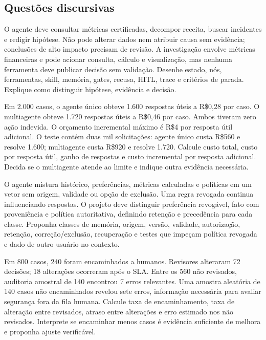 \subsection{Questões discursivas}

\TextoBase
O agente deve consultar métricas certificadas, decompor receita, buscar incidentes e redigir hipótese. Não pode alterar dados nem atribuir causa sem evidência; conclusões de alto impacto precisam de revisão.
A investigação envolve métricas financeiras e pode acionar consulta, cálculo e visualização, mas nenhuma ferramenta deve publicar decisão sem validação.
\FonteDidatica
\Comando Desenhe estado, nós, ferramentas, skill, memória, gates, recusa, HITL, trace e critérios de parada. Explique como distinguir hipótese, evidência e decisão.

\TextoBase
Em 2.000 casos, o agente único obteve 1.600 respostas úteis a R\$0,28 por caso. O multiagente obteve 1.720 respostas úteis a R\$0,46 por caso. Ambos tiveram zero ação indevida. O orçamento incremental máximo é R\$4 por resposta útil adicional.
O teste contém duas mil solicitações: agente único custa R\$560 e resolve 1.600; multiagente custa R\$920 e resolve 1.720.
\FonteDidatica
\Comando Calcule custo total, custo por resposta útil, ganho de respostas e custo incremental por resposta adicional. Decida se o multiagente atende ao limite e indique outra evidência necessária.

\TextoBase
O agente mistura histórico, preferências, métricas calculadas e políticas em um vetor sem origem, validade ou opção de exclusão. Uma regra revogada continua influenciando respostas.
O projeto deve distinguir preferência revogável, fato com proveniência e política autoritativa, definindo retenção e precedência para cada classe.
\FonteDidatica
\Comando Proponha classes de memória, origem, versão, validade, autorização, retenção, correção/exclusão, recuperação e testes que impeçam política revogada e dado de outro usuário no contexto.

\TextoBase
Em 800 casos, 240 foram encaminhados a humanos. Revisores alteraram 72 decisões; 18 alterações ocorreram após o SLA. Entre os 560 não revisados, auditoria amostral de 140 encontrou 7 erros relevantes.
Uma amostra aleatória de 140 casos não encaminhados revelou sete erros, informação necessária para avaliar segurança fora da fila humana.
\FonteDidatica
\Comando Calcule taxa de encaminhamento, taxa de alteração entre revisados, atraso entre alterações e erro estimado nos não revisados. Interprete se encaminhar menos casos é evidência suficiente de melhora e proponha ajuste verificável.

